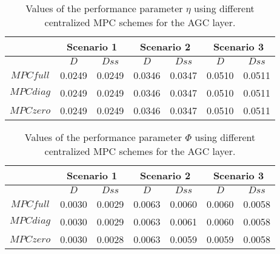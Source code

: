 \documentclass[a4paper]{article}
\begin{document}
          \begin{table}[!ht]
            \centering
            \begin{tabular}{|c||c|c||c|c||c|c|}
              \hline
                                     & \multicolumn{2}{|c||}{Scenario 1} & \multicolumn{2}{|c||}{Scenario 2} & \multicolumn{2}{|c|}{Scenario 3} \\
              \hline
                                     &          $D$            &    $Dss$       &          $D$           &    $Dss$       &          $D$          &    $Dss$        \\
              \hline
              $MPCfull$      &       0.0249           &   0.0249        &    0.0346            &   0.0347        &    0.0510           &      0.0511       \\
              \hline
              $MPCdiag$     &      0.0249            &    0.0249      &     0.0346            &   0.0347        &    0.0510           &    0.0511         \\
              \hline
              $MPCzero$     &       0.0249           &   0.0249       &    0.0346             &   0.0347        &   0.0510            &   0.0511            \\
              \hline
            \end{tabular}
            \caption{Values of the performance parameter $\eta$ using different centralized MPC schemes for the AGC layer.}
            \label{tab:simulationsEta}
          \end{table}

          \begin{table}[!ht]
            \centering
            \begin{tabular}{|c||c|c||c|c||c|c|}
              \hline
                                     & \multicolumn{2}{|c||}{Scenario 1} & \multicolumn{2}{|c||}{Scenario 2} & \multicolumn{2}{|c|}{Scenario 3} \\
              \hline
                                     &          $D$            &    $Dss$       &          $D$           &    $Dss$       &          $D$          &    $Dss$        \\
              \hline
              $MPCfull$       &        0.0030         &   0.0029       &    0.0063              &     0.0060     &      0.0060          &   0.0058         \\
              \hline
              $MPCdiag$     &       0.0030          &   0.0029        &   0.0063              &   0.0061        &   0.0060             &    0.0058        \\
              \hline
              $MPCzero$     &    0.0030            &     0.0028       &    0.0063              &  0.0059        &  0.0059              &   0.0058          \\
              \hline
            \end{tabular}
            \caption{Values of the performance parameter $\Phi$ using different centralized MPC schemes for the AGC layer.}
            \label{tab:simulationsPhi}
          \end{table}
\end{document}

